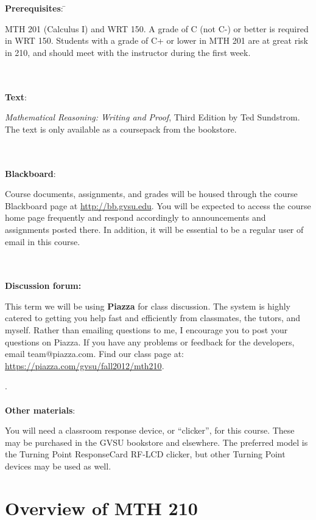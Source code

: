 \documentclass[11pt]{article}
\begin{document}
\begin{tabbing}
\textbf{Prerequisites}: \hspace{0.3in} \= \parbox[t]{5.25in}{MTH 201 (Calculus I) and WRT 150. A grade of C (not C-) or better is required in WRT 150. Students with a grade of C+ or lower in MTH 201 are at great risk in 210, and should meet with the instructor during the first week.} \\
\\
\textbf{Text}: \> \parbox[t]{5.25in}{\emph{Mathematical Reasoning: Writing and Proof}, Third Edition by Ted Sundstrom. The text is only available as a coursepack from the bookstore.}

\\ \\
\textbf{Blackboard}: \> \parbox[t]{5.25in}{Course documents, assignments, and grades will be housed through the course Blackboard page at \url{http://bb.gvsu.edu}. You will be expected to access the course home page frequently and respond accordingly to announcements and assignments posted there. In addition, it will be essential to be a regular user of email in this course.} \\ \\

\textbf{Discussion forum:} \> \parbox[t]{5.25in}{This term we will be using \textbf{Piazza} for class discussion. The system is highly catered to getting you help fast and efficiently from classmates, the tutors, and myself. Rather than emailing questions to me, I encourage you to post your questions on Piazza. If you have any problems or feedback for the developers, email team@piazza.com.
Find our class page at: \url{https://piazza.com/gvsu/fall2012/mth210}.}. \\ \\


\textbf{Other materials}: \> \parbox[t]{5.25in}{You will need a classroom response device, or ``clicker'', for this course. These may be purchased in the GVSU bookstore and elsewhere. The preferred model is the Turning Point ResponseCard RF-LCD clicker, but other Turning Point devices may be used as well. 
}


\end{tabbing}

\section*{Overview of MTH 210}
\end{document}
